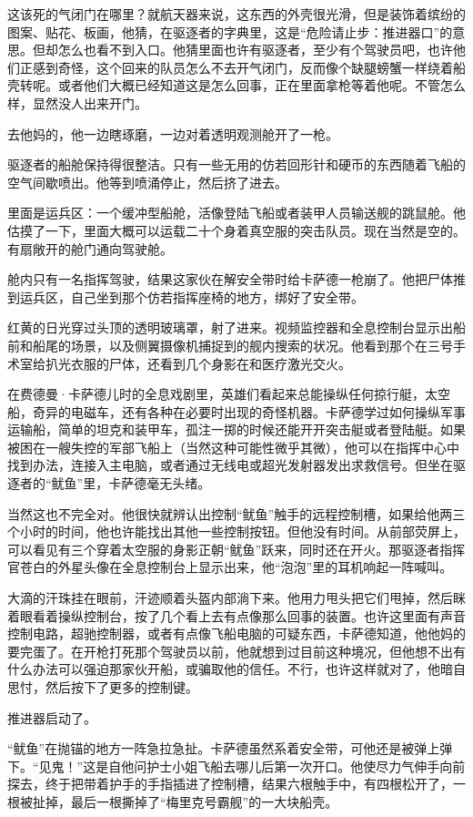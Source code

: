 \documentclass[AutoFakeBold=true]{book}
\begin{document}
这该死的气闭门在哪里？就航天器来说，这东西的外壳很光滑，但是装饰着缤纷的图案、贴花、板画，他猜，在驱逐者的字典里，这是``危险请止步：推进器口''的意思。但却怎么也看不到入口。他猜里面也许有驱逐者，至少有个驾驶员吧，也许他们正感到奇怪，这个回来的队员怎么不去开气闭门，反而像个缺腿螃蟹一样绕着船壳转呢。或者他们大概已经知道这是怎么回事，正在里面拿枪等着他呢。不管怎么样，显然没人出来开门。

{\kaishu 去他妈的}，他一边瞎琢磨，一边对着透明观测舱开了一枪。

驱逐者的船舱保持得很整洁。只有一些无用的仿若回形针和硬币的东西随着飞船的空气间歇喷出。他等到喷涌停止，然后挤了进去。

里面是运兵区：一个缓冲型船舱，活像登陆飞船或者装甲人员输送舰的跳鼠舱。他估摸了一下，里面大概可以运载二十个身着真空服的突击队员。现在当然是空的。有扇敞开的舱门通向驾驶舱。

舱内只有一名指挥驾驶，结果这家伙在解安全带时给卡萨德一枪崩了。他把尸体推到运兵区，自己坐到那个仿若指挥座椅的地方，绑好了安全带。

红黄的日光穿过头顶的透明玻璃罩，射了进来。视频监控器和全息控制台显示出船前和船尾的场景，以及侧翼摄像机捕捉到的舰内搜索的状况。他看到那个在三号手术室给扒光衣服的尸体，还看到几个身影在和医疗激光交火。

在费德曼·卡萨德儿时的全息戏剧里，英雄们看起来总能操纵任何掠行艇，太空船，奇异的电磁车，还有各种在必要时出现的奇怪机器。卡萨德学过如何操纵军事运输船，简单的坦克和装甲车，孤注一掷的时候还能开开突击艇或者登陆艇。如果被困在一艘失控的军部飞船上（当然这种可能性微乎其微），他可以在指挥中心中找到办法，连接入主电脑，或者通过无线电或超光发射器发出求救信号。但坐在驱逐者的``鱿鱼''里，卡萨德毫无头绪。

当然这也不完全对。他很快就辨认出控制``鱿鱼''触手的远程控制槽，如果给他两三个小时的时间，他也许能找出其他一些控制按钮。但他没有时间。从前部荧屏上，可以看见有三个穿着太空服的身影正朝``鱿鱼''跃来，同时还在开火。那驱逐者指挥官苍白的外星头像在全息控制台上显示出来，他``泡泡''里的耳机响起一阵喊叫。

大滴的汗珠挂在眼前，汗迹顺着头盔内部淌下来。他用力甩头把它们甩掉，然后眯着眼看着操纵控制台，按了几个看上去有点像那么回事的装置。也许这里面有声音控制电路，超驰控制器，或者有点像飞船电脑的可疑东西，卡萨德知道，他他妈的要完蛋了。在开枪打死那个驾驶员以前，他就想到过目前这种境况，但他想不出有什么办法可以强迫那家伙开船，或骗取他的信任。不行，也许这样就对了，他暗自思忖，然后按下了更多的控制键。

推进器启动了。

``鱿鱼''在抛锚的地方一阵急拉急扯。卡萨德虽然系着安全带，可他还是被弹上弹下。``见鬼！''这是自他问护士小姐飞船去哪儿后第一次开口。他使尽力气伸手向前探去，终于把带着护手的手指插进了控制槽，结果六根触手中，有四根松开了，一根被扯掉，最后一根撕掉了``梅里克号霸舰''的一大块船壳。
\end{document}
